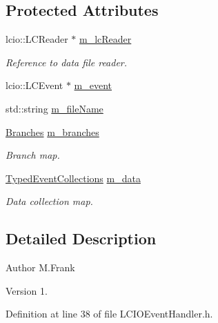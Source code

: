 \subsection*{Protected Attributes}
\begin{DoxyCompactItemize}
\item 
lcio\+::\+L\+C\+Reader $\ast$ \hyperlink{class_d_d4hep_1_1_l_c_i_o_event_handler_ae350f66667954755d793b2e4a41adbba}{m\+\_\+lc\+Reader}
\begin{DoxyCompactList}\small\item\em Reference to data file reader. \end{DoxyCompactList}\item 
lcio\+::\+L\+C\+Event $\ast$ \hyperlink{class_d_d4hep_1_1_l_c_i_o_event_handler_a8ec477793e0d557bb46f65953c9366d2}{m\+\_\+event}
\item 
std\+::string \hyperlink{class_d_d4hep_1_1_l_c_i_o_event_handler_ad46f1b438e65d08e5ebbe5bb8df25347}{m\+\_\+file\+Name}
\item 
\hyperlink{class_d_d4hep_1_1_l_c_i_o_event_handler_abb97052600fb229e9fdc6cfeefdc4177}{Branches} \hyperlink{class_d_d4hep_1_1_l_c_i_o_event_handler_affa8da5c2619446e0e5c5cf9d4ad3d69}{m\+\_\+branches}
\begin{DoxyCompactList}\small\item\em Branch map. \end{DoxyCompactList}\item 
\hyperlink{class_d_d4hep_1_1_event_handler_a4d441ff8a824b1e2f278e8b7a6391af3}{Typed\+Event\+Collections} \hyperlink{class_d_d4hep_1_1_l_c_i_o_event_handler_aad03bcadad9458ec37c9e13209481595}{m\+\_\+data}
\begin{DoxyCompactList}\small\item\em Data collection map. \end{DoxyCompactList}\end{DoxyCompactItemize}


\subsection{Detailed Description}
\begin{DoxyAuthor}{Author}
M.\+Frank 
\end{DoxyAuthor}
\begin{DoxyVersion}{Version}
1. 
\end{DoxyVersion}


Definition at line 38 of file L\+C\+I\+O\+Event\+Handler.\+h.



